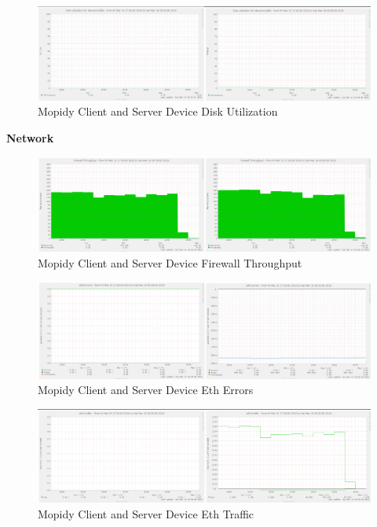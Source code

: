 \documentclass[11pt,a4paper]{scrreprt}
\begin{document}
\begin{figure}[H]
\includegraphics{ResultsAndAnalysis/MopidyServerTestImages/009MopidyDiskUtilization.png}
\centering
\caption{Mopidy Client and Server Device Disk Utilization}
\label{MopidyDiskUtil}
\end{figure}

\textbf{Network}

\begin{figure}[H]
\includegraphics{ResultsAndAnalysis/MopidyServerTestImages/012MopidyFirewallThroughput.png}
\centering
\caption{Mopidy Client and Server Device Firewall Throughput}
\label{MopidyFirewallThroughput}
\end{figure}

\begin{figure}[H]
\includegraphics{ResultsAndAnalysis/MopidyServerTestImages/010MopidyEth0Errors.png}
\centering
\caption{Mopidy Client and Server Device Eth Errors}
\label{MopidyEthError}
\end{figure}

\begin{figure}[H]
\includegraphics{ResultsAndAnalysis/MopidyServerTestImages/011MopidyEth0Traffic.png}
\centering
\caption{Mopidy Client and Server Device Eth Traffic}
\label{MopidyEthTraffic}
\end{figure}
\end{document}
